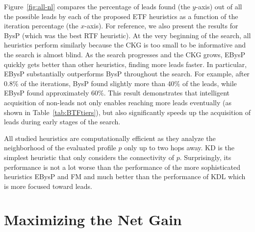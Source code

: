 \documentclass[journal]{IEEEtran}
\newcommand{\islead}[1]{{\em IsLead(#1)}}
\begin{document}


Figure~\ref{fig:all-nl} compares the percentage of leads found (the $y$-axis) out of all the possible leads by each of the proposed ETF heuristics as a function of the iteration percentage (the $x$-axis).
 For reference, we also present the results for BysP (which was the best RTF heuristic).
At the very beginning of the search, all heuristics perform similarly because the CKG
is too small to be informative and the search is almost blind. As the search
progresses and the CKG grows, EBysP quickly gets better than other  heuristics,
finding more leads faster. In particular, EBysP substantially outperforms BysP throughout the search. 
For example, after  0.8\% of the iterations, BysP found slightly more than 40\% of the leads, while EBysP
found approximately 60\%. This result demonstrates that intelligent acquisition
of non-leads not only enables reaching more leads eventually (as shown in
Table~\ref{tab:BTFtiers}), but also significantly speeds up the acquisition of
leads during  early stages of the search.


All studied heuristics are computationally efficient as they analyze the
neighborhood of the evaluated profile $p$ only up to two hops away. KD is the
simplest heuristic that only considers the connectivity of $p$. Surprisingly,
its performance is not a lot worse than the performance of the more sophisticated
heuristics EBysP and FM and much better than the performance of KDL which is
more focused toward leads.




\section{Maximizing the Net Gain}
\label{sec:costbenefit}
\end{document}
